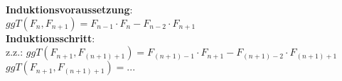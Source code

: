\documentclass[11pt,a4paper]{article}
\begin{document}
\textbf{Induktionsvoraussetzung}:\\
$ggT(F_n, F_{n+1}) = F_{n-1} \cdot F_n - F_{n-2}\cdot F_{n+1}$\\

\textbf{Induktionsschritt}:\\
z.z.: $ggT(F_{n+1}, F_{(n+1)+1})=F_{(n+1)-1} \cdot F_{n+1} - F_{(n+1)-2} \cdot F_{(n+1)+1}$\\
$ggT(F_{n+1}, F_{(n+1)+1})= ...$


\end{document}
